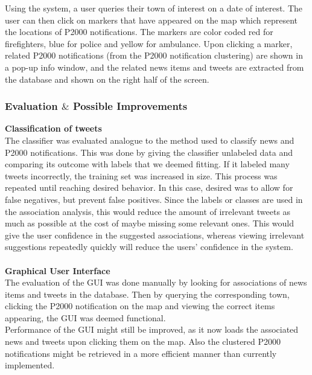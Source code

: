 Using the system, a user queries their town of interest on a date of interest. The user can then click on markers that have appeared on the map which represent the locations of P2000 notifications. The markers are color coded red for firefighters, blue for police and yellow for ambulance. Upon clicking a marker, related P2000 notifications (from the P2000 notification clustering) are shown in a pop-up info window, and the related news items and tweets are extracted from the database and shown on the right half of the screen. \\


\subsubsection*{Evaluation $\&$ Possible Improvements}
\textbf{Classification of tweets}\\
The classifier was evaluated analogue to the method used to classify news and P2000 notifications. This was done by giving the classifier unlabeled data and comparing its outcome with labels that we deemed fitting. If it labeled many tweets incorrectly, the training set was increased in size. This process was repeated until reaching desired behavior. In this case, desired was to allow for false negatives, but prevent false positives. Since the labels or classes are used in the association analysis, this would reduce the amount of irrelevant tweets as much as possible at the cost of maybe missing some relevant ones. This would give the user confidence in the suggested associations, whereas viewing irrelevant suggestions repeatedly quickly will reduce the users' confidence in the system.\\
\\
\textbf{Graphical User Interface}\\
The evaluation of the GUI was done manually by looking for associations of news items and tweets in the database. Then by querying the corresponding town, clicking the P2000 notification on the map and viewing the correct items appearing, the GUI was deemed functional. \\

Performance of the GUI might still be improved, as it now loads the associated news and tweets upon clicking them on the map. Also the clustered P2000 notifications might be retrieved in a more efficient manner than currently implemented.
